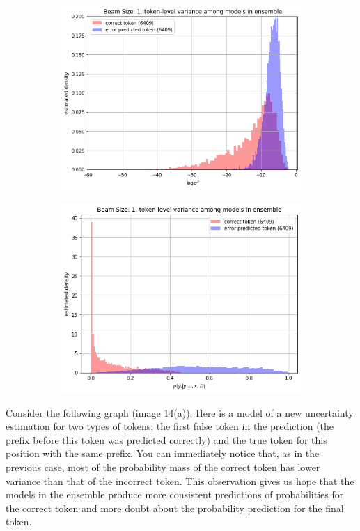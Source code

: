 \documentclass[a4paper,14pt]{extarticle}
\begin{document}
	\begin{figure}[t]
		\begin{subfigure}{.5\textwidth}
			\includegraphics[width=\textwidth]{images/inens_var_density.png}
		\end{subfigure}
		\begin{subfigure}{.5\textwidth}
			\includegraphics[width=\textwidth]{images/inens_mean_density.png}
		\end{subfigure}
	\end{figure}
	Consider the following graph (image 14(a)). Here is a model of a new uncertainty estimation for two types of tokens: the first false token in the prediction (the prefix before this token was predicted correctly) and the true token for this position with the same prefix. You can immediately notice that, as in the previous case, most of the probability mass of the correct token has lower variance than that of the incorrect token. This observation gives us hope that the models in the ensemble produce more consistent predictions of probabilities for the correct token and more doubt about the probability prediction for the final token.
\end{document}
